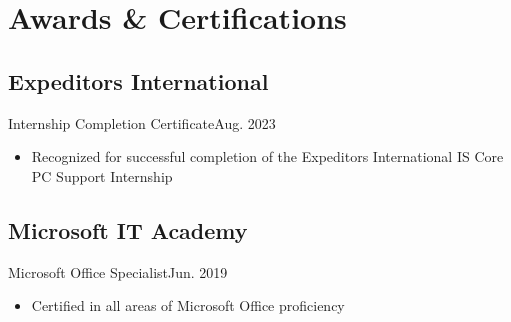 \section{Awards \& Certifications}
\subsection{Expeditors International}{Internship Completion Certificate}{}{Aug. 2023}
\begin{itemize}
    \item Recognized for successful completion of the Expeditors International IS Core PC Support Internship
\end{itemize}


\subsection{Microsoft IT Academy}{Microsoft Office Specialist}{}{Jun. 2019}
\begin{itemize}
    \item Certified in all areas of Microsoft Office proficiency
\end{itemize}
